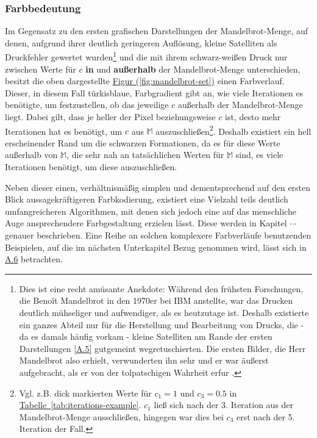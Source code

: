 \subsubsection{Farbbedeutung}

Im Gegensatz zu den ersten grafischen Darstellungen der Mandelbrot-Menge,
auf denen, aufgrund ihrer deutlich geringeren Auflösung,
kleine Satelliten als Druckfehler gewertet wurden\footnote{
  Dies ist eine recht amüsante Anekdote: Während den frühsten Forschungen,
  die Benoît Mandelbrot in den 1970er bei IBM anstellte, war das Drucken deutlich
  mühseliger und aufwendiger, als es heutzutage ist.
  Deshalb existierte ein ganzes Abteil nur für die Herstellung und Bearbeitung von
  Drucks, die - da es damals häufig vorkam - kleine Satelliten am Rande der ersten
  Darstellungen \hyperref[app:5]{[A.5]} gutgemeint wegretuschierten.
  Die ersten Bilder, die Herr Mandelbrot also erhielt, verwunderten ihn sehr und
  er war äußerst aufgebracht, als er von der tolpatschigen Wahrheit erfur
  \cite{numberphile_whats_2019}.
}
und die mit ihrem schwarz-weißen Druck nur zwischen Werte für $c$ \textbf{in}
und \textbf{außerhalb} der Mandelbrot-Menge unterschieden,
besitzt die oben dargestellte
\hyperref[fig:mandelbrot-set]{Figur (\ref{fig:mandelbrot-set})}
einen Farbverlauf.
Dieser, in diesem Fall türkisblaue, Farbgradient gibt an,
wie viele Iterationen es benötigte,
um festzustellen, ob das jeweilige $c$ außerhalb der Mandelbrot-Menge liegt.
Dabei gilt, dass je heller der Pixel beziehungsweise $c$ ist, desto mehr
Iterationen hat es benötigt, um $c$ aus $\mathbb{M}$ auszuschließen\footnote{
  Vgl. z.B. dick markierten Werte für $c_1 = 1 \text{ und } c_3 = 0.5$ in
  \hyperref[tab:iterations-example]{Tabelle~\ref{tab:iterations-example}}.
  $c_1$ ließ sich nach der 3. Iteration aus der Mandelbrot-Menge ausschließen,
  hingegen war dies bei $c_3$ erst nach der 5. Iteration der Fall.
}.
Deshalb existiert ein hell erscheinender Rand um die schwarzen Formationen,
da es für diese Werte außerhalb von $\mathbb{M}$, die sehr nah an tatsächlichen
Werten für $\mathbb{M}$ sind, es viele Iterationen benötigt, um diese auszuschließen.

Neben dieser einen, verhältnismäßig simplen und dementsprechend auf den ersten
Blick aussagekräftigeren Farbkodierung, existiert eine Vielzahl teils deutlich
umfangreicheren Algorithmen, mit denen sich jedoch eine auf das menschliche Auge
ansprechendere Farbgestaltung erzielen lässt.
Diese werden in Kapitel $\cdots$ %
genauer beschrieben.
Eine Reihe an solchen komplexere Farbverläufe benutzenden Beispielen,
auf die im nächsten Unterkapitel Bezug genommen wird,
lässt sich in \hyperref[app:6]{A.6} betrachten.

